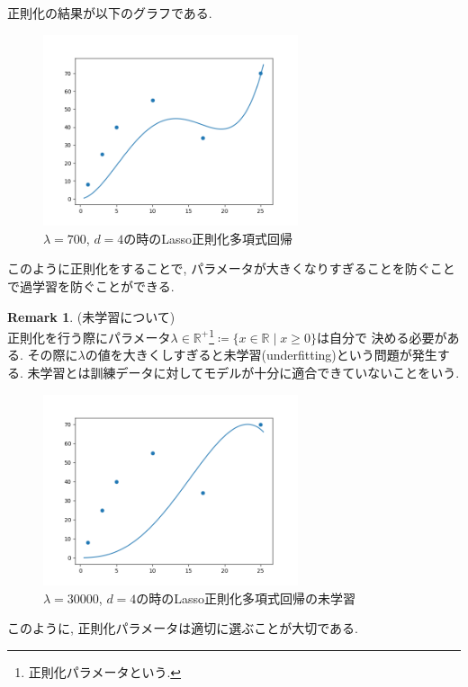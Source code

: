 \documentclass[11pt, a4paper, dvipdfmx]{jsarticle}
\theoremstyle{definition}
\newtheorem{Remark+}[Axiom+]{Remark}
\newcommand{\R}{\mathbb{R}}
\begin{document}
正則化の結果が以下のグラフである.
\begin{figure}[H]
    \centering
    \includegraphics[width = 7.5cm]{regulaer_PR.png}
    \caption{$\lambda = 700$, $d = 4$の時のLasso正則化多項式回帰}
\end{figure}
このように正則化をすることで, パラメータが大きくなりすぎることを防ぐことで過学習を防ぐことができる.
\begin{Remark+}(未学習について)\\
    正則化を行う際にパラメータ$\lambda\in\R^+$\footnote{正則化パラメータという.}$\coloneqq\{x\in\R\mid x\geq0\}$は自分で
    決める必要がある. その際に$\lambda$の値を大きくしすぎると未学習(underfitting)という問題が発生する.
    未学習とは訓練データに対してモデルが十分に適合できていないことをいう.
    \begin{figure}[H]
        \centering
        \includegraphics[width=7.5cm]{underfitting_PR.png}
        \caption{$\lambda = 30000$, $d = 4$の時のLasso正則化多項式回帰の未学習}
    \end{figure}
    このように, 正則化パラメータは適切に選ぶことが大切である. 
\end{Remark+}
\end{document}
